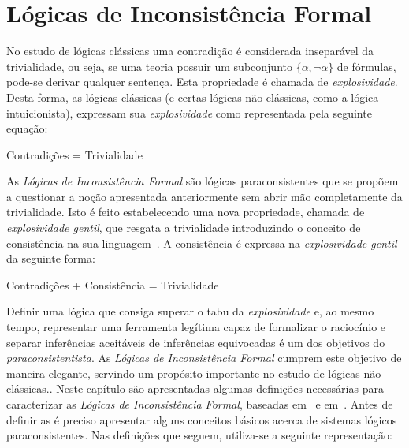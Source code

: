 \chapter{Lógicas de Inconsistência Formal}
\label{cap:LFIs}
No estudo de lógicas clássicas uma contradição é considerada inseparável da trivialidade, ou seja, se uma teoria possuir um subconjunto $\{\alpha,\neg \alpha\}$ de fórmulas, pode-se derivar qualquer sentença. Esta propriedade é chamada de \textit{explosividade}. Desta forma, as lógicas clássicas (e certas lógicas não-clássicas, como a lógica intuicionista), expressam sua \textit{explosividade} como representada pela seguinte equação:
\begin{center}
    Contradições = Trivialidade
\end{center}
As \textit{Lógicas de Inconsistência Formal} são lógicas paraconsistentes que se propõem a questionar a noção apresentada anteriormente sem abrir mão completamente da trivialidade. Isto é feito estabelecendo uma nova propriedade, chamada de \textit{explosividade gentil}, que resgata a trivialidade introduzindo o conceito de consistência na sua linguagem~\cite{carnielli2007}. A consistência é expressa na \textit{explosividade gentil} da seguinte forma:
\begin{center}
    Contradições + Consistência = Trivialidade
\end{center}
Definir uma lógica que consiga superar o tabu da \textit{explosividade} e, ao mesmo tempo, representar uma ferramenta legítima capaz de formalizar o raciocínio e separar inferências aceitáveis de inferências equivocadas é um dos objetivos do \textit{paraconsistentista}. As \textit{Lógicas de Inconsistência Formal} cumprem este objetivo de maneira elegante, servindo um propósito importante no estudo de lógicas não-clássicas..
Neste capítulo são apresentadas algumas definições necessárias para caracterizar as \textit{Lógicas de Inconsistência Formal}, baseadas em~ e em~. Antes de definir as \lfis{} é preciso apresentar alguns conceitos básicos acerca de sistemas lógicos paraconsistentes. Nas definições que seguem, utiliza-se a seguinte representação: 
